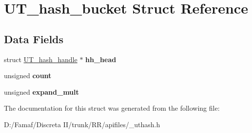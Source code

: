 \hypertarget{struct_u_t__hash__bucket}{\section{U\+T\+\_\+hash\+\_\+bucket Struct Reference}
\label{struct_u_t__hash__bucket}
}
\subsection*{Data Fields}
\begin{DoxyCompactItemize}
\item 
\hypertarget{struct_u_t__hash__bucket_a32d33f384f3c99c1fd80202e1cd64c0c}{struct \hyperlink{struct_u_t__hash__handle}{U\+T\+\_\+hash\+\_\+handle} $\ast$ {\bfseries hh\+\_\+head}}\label{struct_u_t__hash__bucket_a32d33f384f3c99c1fd80202e1cd64c0c}

\item 
\hypertarget{struct_u_t__hash__bucket_a6a9e89d63eb610dfe238b0a840979421}{unsigned {\bfseries count}}\label{struct_u_t__hash__bucket_a6a9e89d63eb610dfe238b0a840979421}

\item 
\hypertarget{struct_u_t__hash__bucket_a49a220a340de3b9ed14648a82472ab84}{unsigned {\bfseries expand\+\_\+mult}}\label{struct_u_t__hash__bucket_a49a220a340de3b9ed14648a82472ab84}

\end{DoxyCompactItemize}


The documentation for this struct was generated from the following file\+:\begin{DoxyCompactItemize}
\item 
D\+:/\+Famaf/\+Discreta I\+I/trunk/\+R\+R/apifiles/\+\_\+uthash.\+h\end{DoxyCompactItemize}
